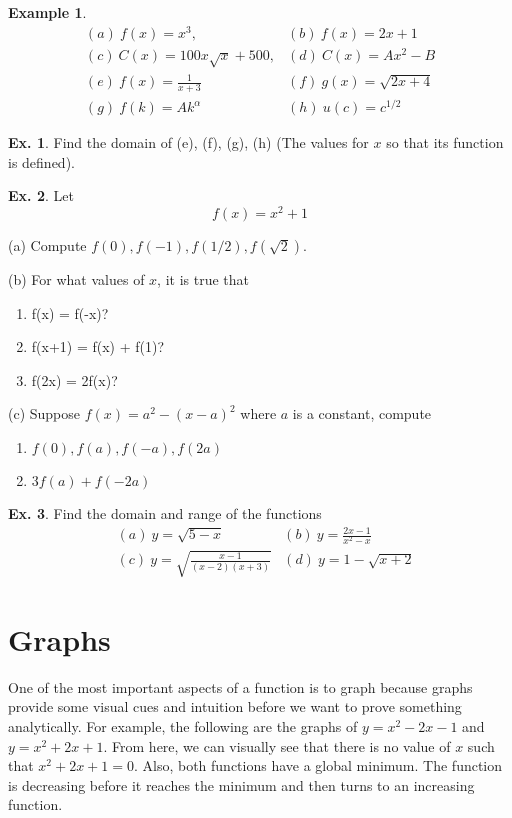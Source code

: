 \documentclass[10pt,a4paper]{book}
\theoremstyle{definition}\newtheorem{definition}{Definition}
\theoremstyle{definition}\newtheorem{fact}{Fact}
\theoremstyle{definition}\newtheorem{ex}{Ex.}
\theoremstyle{definition}\newtheorem{project}{Project}
\theoremstyle{definition}\newtheorem{problem}{Problem}
\theoremstyle{definition}\newtheorem{example}{Example}
\numberwithin{theorem}{chapter}
\numberwithin{corollary}{chapter}
\numberwithin{assumption}{chapter}
\numberwithin{definition}{chapter}
\numberwithin{prop}{chapter}
\numberwithin{notation}{chapter}
\numberwithin{problem}{chapter}
\numberwithin{example}{chapter}
\numberwithin{fact}{chapter}
\numberwithin{ex}{chapter}
\begin{document}
	\begin{example}
		\begin{align*}
			& (a) \ f(x) = x^3,                & (b) \ f(x) = 2x + 1      \\
			& (c) \ C(x) = 100x\sqrt{x} + 500, & (d) \ C(x) = Ax^2 - B    \\
			& (e) \ f(x) = \frac{1}{x+3} &(f) \ g(x) = \sqrt{2x+4} &                          \\
			& (g) \ f(k) = A k^\alpha          & (h) \ u(c) = c^{1/2}     
		\end{align*}
	\end{example}
	
	\begin{ex}
		Find the domain of (e), (f), (g), (h) (The values for $x$ so that its function is defined).
	\end{ex}
	
	\begin{ex}
		Let 
		\begin{equation*}
			f(x) = x^2 + 1
		\end{equation*}
		
		(a) Compute $f(0), f(-1), f(1/2), f(\sqrt{2})$.
		
		(b) For what values of $x$, it is true that
		\begin{enumerate}
			\item f(x) = f(-x)?
			\item f(x+1) = f(x) + f(1)?
			\item f(2x) = 2f(x)?
		\end{enumerate}
		
		(c) Suppose $f(x) = a^2 - (x-a)^2$ where $a$ is a constant, compute 
		\begin{enumerate}
			\item $f(0), f(a), f(-a), f(2a)$ 
			\item $3f(a) + f(-2a)$
		\end{enumerate}
	\end{ex}
	
	\begin{ex}
		Find the domain and range of the functions
		\begin{align*}
			& (a) \ y = \sqrt{5-x}                   
			& (b) \ y = \frac{2x-1}{x^2-x}           \\
			& (c) \ y= \sqrt{\frac{x-1}{(x-2)(x+3)}} 
			& (d) \ y = 1-\sqrt{x+2}                 
		\end{align*}
	\end{ex}
	
	\section{Graphs}
	One of the most important aspects of a function is to graph because graphs provide some visual cues and intuition before we want to prove something analytically. For example, the following are the graphs of $y=x^2-2x-1$ and $y=x^2+2x+1$. From here, we can visually see that there is no value of $x$ such that $x^2+2x+1=0$. Also, both functions have a global minimum. The function is decreasing before it reaches the minimum and then turns to an increasing function. 
	
\end{document}

